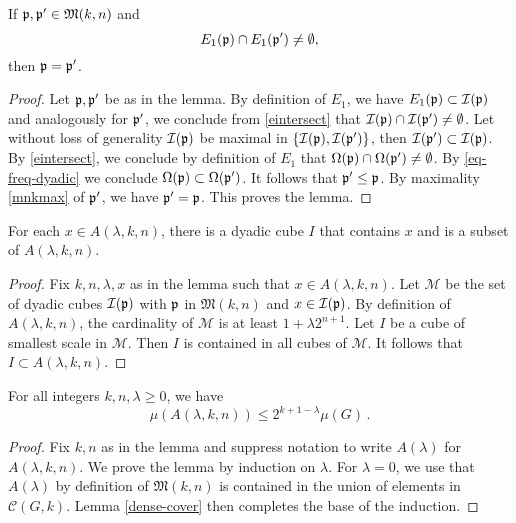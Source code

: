 {\begin{lemma}
\label{pairwise-disjoint}

     If ${\mathfrak p}, {\mathfrak p}' \in {\mathfrak{M}}(k,n)$ and
     \begin{equation}\label{eintersect}
     {E_1}({\mathfrak p})\cap {E_1}({\mathfrak p}')\neq \emptyset,
     \end{equation}
     then ${\mathfrak p}={\mathfrak p}'$.
\end{lemma}
\begin{proof}
Let ${\mathfrak p},{\mathfrak p}'$ be as in the lemma. By definition of $E_1$,
we have
$E_1({\mathfrak p})\subset {\mathcal{I}}({\mathfrak p})$ and analogously for ${\mathfrak p}'$, we conclude from \eqref{eintersect} that  ${\mathcal{I}}({\mathfrak p})\cap {\mathcal{I}}({\mathfrak p}')\neq \emptyset$. Let without loss of generality ${\mathcal{I}}({\mathfrak p})$ be maximal in
$\{{\mathcal{I}}({\mathfrak p}),{\mathcal{I}}({\mathfrak p}')\}$, then ${\mathcal{I}}({\mathfrak p}')\subset {\mathcal{I}}({\mathfrak p})$.
By \eqref{eintersect}, we conclude by definition of $E_1$ that ${\Omega}({\mathfrak p})\cap {\Omega}({\mathfrak p}')\neq \emptyset$. By
\eqref{eq-freq-dyadic} we conclude ${\Omega}({\mathfrak p})\subset {\Omega}({\mathfrak p}')$. It follows that ${\mathfrak p}'\le {\mathfrak p}$. By maximality
\eqref{mnkmax}
of ${\mathfrak p}'$, we have ${\mathfrak p}'={\mathfrak p}$. This proves the lemma.
\end{proof}


\begin{lemma}
\label{dyadic-union}

For each  $x\in A(\lambda,k,n)$,
there is a dyadic cube $I$
that contains $x$ and is
a subset of
$A(\lambda,k,n)$.
\end{lemma}

\begin{proof}
Fix $k,n,\lambda,x$ as in the lemma such that $x\in A(\lambda,k,n)$.
Let $\mathcal{M}$ be the set of dyadic cubes ${\mathcal{I}}({\mathfrak p})$ with ${\mathfrak p}$ in $\mathfrak{M}(k,n)$ and $x\in {\mathcal{I}}({\mathfrak p})$.
By definition of $A(\lambda,k,n)$, the cardinality of $\mathcal{M}$ is at least $1+\lambda 2^{n+1}$.
Let $I$ be a cube of smallest scale in $\mathcal{M}$.
Then $I$ is contained in all cubes of $\mathcal{M}$.
It follows that $I\subset A(\lambda,k,n)$.
\end{proof}

\begin{lemma}
\label{John-Nirenberg}
    For all integers $k,n,\lambda\ge 0$, we have
    \begin{equation}\label{alambdameasure}
        \mu(A(\lambda,k,n))        \le 2^{k+1-\lambda}\mu(G)\, .
    \end{equation}


\end{lemma}
\begin{proof}
Fix $k,n$ as in the lemma
and suppress notation to write
$A(\lambda)$ for $A(\lambda,k,n)$.
We prove the lemma by induction on $\lambda$.
For $\lambda=0$, we use that $A(\lambda)$ by definition of $\mathfrak{M}(k,n)$ is contained in the union of elements in $ \mathcal{C}(G,k)$. Lemma \ref{dense-cover} then completes  the base of the induction.


\end{proof}}
